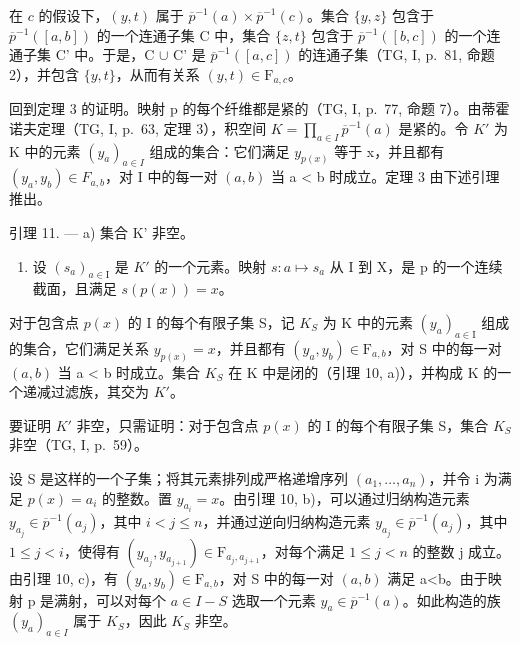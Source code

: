 在 \(c\) 的假设下，\((y,t)\) 属于 \(\overline{p}^{-1}(a)\times\overline{p}^{-1}(c)\)。集合 \(\{y,z\}\) 包含于 \(\overline{p}^{-1}([a,b])\) 的一个连通子集 C 中，集合 \(\{z,t\}\) 包含于 \(\overline{p}^{-1}([b,c])\) 的一个连通子集 C' 中。于是，C \(\cup\) C' 是 \(\overline{p}^{-1}([a,c])\) 的连通子集（TG, I, p.~81, 命题 2），并包含 \(\{y,t\}\)，从而有关系 \((y,t)\in\mathrm{F}_{a,c}\)。

回到定理 3 的证明。映射 p 的每个纤维都是紧的（TG, I, p.~77, 命题 7）。由蒂霍诺夫定理（TG, I, p.~63, 定理 3），积空间 \(K = \prod_{a \in I} \overline{p}^{-1}(a)\) 是紧的。令 \(K'\) 为 K 中的元素 \((y_{a})_{a \in I}\) 组成的集合：它们满足 \(y_{p(x)}\) 等于 x，并且都有 \((y_{a}, y_{b}) \in F_{a,b}\)，对 I 中的每一对 \((a, b)\) 当 a \textless{} b 时成立。定理 3 由下述引理推出。

引理 11. --- a) 集合 K' 非空。

\begin{enumerate}
\def\labelenumi{\alph{enumi})}
\setcounter{enumi}{1}
\tightlist
\item
  设 \((s_{a})_{a\in\mathrm{I}}\) 是 \(K'\) 的一个元素。映射 \(s\colon a\mapsto s_{a}\) 从 I 到 X，是 p 的一个连续截面，且满足 \(s(p(x))=x\)。
\end{enumerate}

对于包含点 \(p(x)\) 的 I 的每个有限子集 S，记 \(K_{S}\) 为 K 中的元素 \((y_{a})_{a\in\mathrm{I}}\) 组成的集合，它们满足关系 \(y_{p(x)} = x\)，并且都有 \((y_{a}, y_{b}) \in \mathrm{F}_{a,b}\)，对 S 中的每一对 \((a, b)\) 当 a \textless{} b 时成立。集合 \(K_{S}\) 在 K 中是闭的（引理 10, a)），并构成 K 的一个递减过滤族，其交为 \(K'\)。

要证明 \(K'\) 非空，只需证明：对于包含点 \(p(x)\) 的 I 的每个有限子集 S，集合 \(K_{S}\) 非空（TG, I, p.~59）。

设 S 是这样的一个子集；将其元素排列成严格递增序列 \((a_{1},\ldots,a_{n})\)，并令 i 为满足 \(p(x)=a_{i}\) 的整数。置 \(y_{a_{i}}=x\)。由引理 10, b)，可以通过归纳构造元素 \(y_{a_{j}}\in\overline{p}^{-1}(a_{j})\)，其中 \(i<j\leqslant n\)，并通过逆向归纳构造元素 \(y_{a_{j}}\in\overline{p}^{-1}(a_{j})\)，其中 \(1\leqslant j<i\)，使得有 \((y_{a_{j}},y_{a_{j+1}})\in\mathrm{F}_{a_{j},a_{j+1}}\)，对每个满足 \(1\leqslant j<n\) 的整数 j 成立。由引理 10, c)，有 \((y_{a},y_{b})\in\mathrm{F}_{a,b}\)，对 S 中的每一对 \((a,b)\) 满足 a\textless b。由于映射 p 是满射，可以对每个 \(a\in I-S\) 选取一个元素 \(y_{a}\in\overline{p}^{-1}(a)\)。如此构造的族 \((y_{a})_{a\in I}\) 属于 \(K_{S}\)，因此 \(K_{S}\) 非空。


